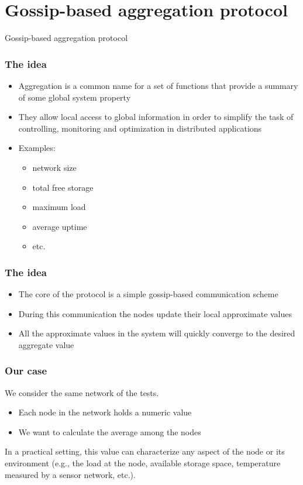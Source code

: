 \documentclass{beamer}
\begin{document}
\section{Gossip-based aggregation protocol}

\begin{frame}[c]

\Huge{\centerline{Gossip-based aggregation protocol}}

\end{frame}


\begin{frame}
\frametitle{The idea}

\begin{itemize}
  \item Aggregation is a common name for a set of functions that provide a summary of some global system property
  \item They allow local access to global information in order to simplify the task of controlling, monitoring and optimization in distributed applications
  \item Examples:
  \begin{itemize}
    \item network size
    \item total free storage
    \item maximum load
    \item average uptime
    \item etc.
  \end{itemize}
\end{itemize}

\end{frame}

\begin{frame}
\frametitle{The idea}
\begin{itemize}
  \item The core of the protocol is a simple gossip-based communication scheme
  \item During this communication the nodes update their local approximate values
  \item All the approximate values in the system will quickly converge to the desired aggregate value
\end{itemize}
\end{frame}

\begin{frame}
\frametitle{Our case}
We consider the same network of the tests.
\begin{itemize}
  \item Each node in the network holds a numeric value
  \item We want to calculate the average among the nodes
\end{itemize}

In a practical setting, this value can characterize any aspect of the node or its environment (e.g., the load at the node, available storage space, temperature measured by a sensor network, etc.).

\end{frame}
\end{document}
